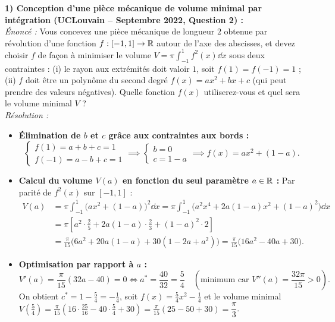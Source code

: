 \begin{exemple}
\textbf{1) Conception d'une pièce mécanique de volume minimal par intégration (UCLouvain -- Septembre 2022, Question 2) :}\\
\emph{Énoncé :} Vous concevez une pièce mécanique de longueur $2$ obtenue par révolution d'une fonction $f : [-1, 1] \to \mathbb{R}$ autour de l'axe des abscisses, et devez choisir $f$ de façon à minimiser le volume $V = \pi \int_{-1}^1 f^2(x)\dd x$ sous deux contraintes :
(i) le rayon aux extrémités doit valoir $1$, soit $f(1) = f(-1) = 1$ ;
(ii) $f$ doit être un polynôme du second degré $f(x) = ax^2 + bx + c$ (qui peut prendre des valeurs négatives).
Quelle fonction $f(x)$ utiliserez-vous et quel sera le volume minimal $V$ ?\\
\emph{Résolution :}
\begin{itemize}
    \item \textbf{Élimination de $b$ et $c$ grâce aux contraintes aux bords :}
    \[
        \begin{cases} f(1) = a + b + c = 1 \\ f(-1) = a - b + c = 1 \end{cases} \implies \begin{cases} b = 0 \\ c = 1 - a \end{cases} \implies f(x) = ax^2 + (1 - a).
    \]
    \item \textbf{Calcul du volume $V(a)$ en fonction du seul paramètre $a \in \mathbb{R}$ :} Par parité de $f^2(x)$ sur $[-1, 1]$ :
    \begin{align*}
        V(a) &= \pi \int_{-1}^1 \bigl(ax^2 + (1-a)\bigr)^2\dd x = \pi \int_{-1}^1 \bigl(a^2 x^4 + 2a(1-a)x^2 + (1-a)^2\bigr)\dd x \\
        &= \pi\left[a^2\cdot\frac{2}{5} + 2a(1-a)\cdot\frac{2}{3} + (1-a)^2\cdot 2\right] \\
        &= \frac{\pi}{15}\bigl(6a^2 + 20a(1-a) + 30(1 - 2a + a^2)\bigr) = \frac{\pi}{15}\bigl(16a^2 - 40a + 30\bigr).
    \end{align*}
    \item \textbf{Optimisation par rapport à $a$ :}
    \[
        V'(a) = \frac{\pi}{15}(32a - 40) = 0 \iff \boxed{a^* = \frac{40}{32} = \frac{5}{4}} \quad (\text{minimum car } V''(a) = \frac{32\pi}{15} > 0).
    \]
    On obtient $c^* = 1 - \frac{5}{4} = -\frac{1}{4}$, soit $\boxed{f(x) = \frac{5}{4}x^2 - \frac{1}{4}}$ et le volume minimal $V\left(\frac{5}{4}\right) = \frac{\pi}{15}\left(16\cdot\frac{25}{16} - 40\cdot\frac{5}{4} + 30\right) = \frac{\pi}{15}(25 - 50 + 30) = \boxed{\dfrac{\pi}{3}}$.
\end{itemize}


\end{exemple}
